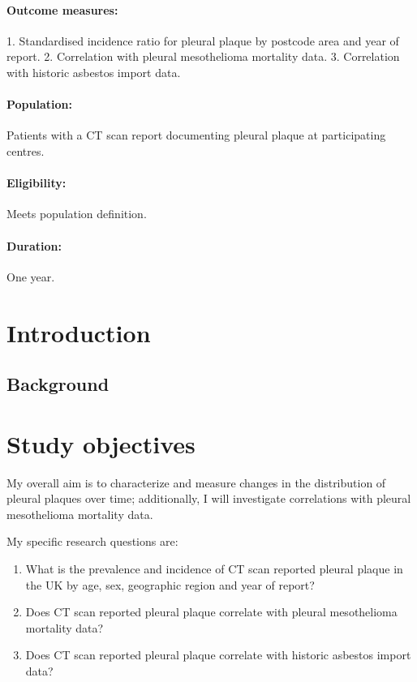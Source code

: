 \documentclass[a4paper,10pt]{article}
\begin{document}
\paragraph{Outcome measures:} 1. Standardised incidence ratio for pleural plaque by postcode area and year of report. 2. Correlation with pleural mesothelioma mortality data. 3. Correlation with historic asbestos import data.
\paragraph{Population:} Patients with a CT scan report documenting pleural plaque at participating centres.
\paragraph{Eligibility:} Meets population definition.
\paragraph{Duration:} One year.


\newpage


\section{Introduction}
\subsection{Background}


\section{Study objectives}

My overall aim is to characterize and measure changes in the distribution of pleural plaques over time; additionally, I will investigate correlations with pleural mesothelioma mortality data.

My specific research questions are:

\begin{enumerate}
    \item What is the prevalence and incidence of CT scan reported pleural plaque in the UK by age, sex, geographic region and year of report?
    \item Does CT scan reported pleural plaque correlate with pleural mesothelioma mortality data?
    \item Does CT scan reported pleural plaque correlate with historic asbestos import data?
\end{enumerate}
\end{document}
